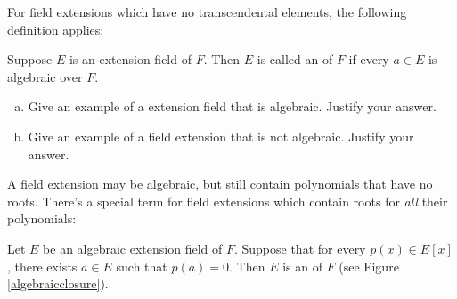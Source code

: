 For field extensions which have no transcendental elements, the following definition applies:

\begin{defn}\label{def:algfieldextension}  
Suppose $E$ is an extension field of $F$. Then $E$ is called an  of $F$ if every $a\in E$ is algebraic over $F$. %
 \end{defn}

\begin{exercise}
\begin{enumerate}[(a)]
\item
Give an example of a extension field that is algebraic. Justify your answer.
\item
Give an example of a field extension that is not algebraic. Justify your answer.
\end{enumerate}
\end{exercise}

A field extension may be algebraic, but still contain polynomials that have no roots. There's a special term for field extensions which contain roots for \emph{all} their polynomials:


\begin{defn}\label{def:algclosure}  
Let $E$ be an algebraic extension field of $F$. Suppose that for every $p(x) \in E[x]$, there exists $a \in E$ such that $p(a)=0$.  Then  $E$ is  an  of $F$ (see Figure \ref{algebraicclosure}).
\end{defn}

